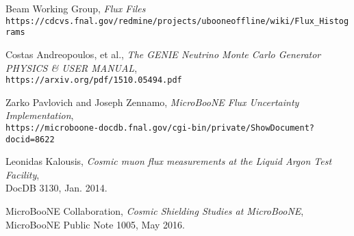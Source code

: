 \begin{thebibliography}{20}
  Beam Working Group, \emph{Flux Files}\\
  \texttt{https://cdcvs.fnal.gov/redmine/projects/ubooneoffline/wiki/Flux\_Histograms}

  Costas Andreopoulos, et al., \emph{The GENIE Neutrino Monte Carlo Generator PHYSICS \& USER MANUAL},\\
  \texttt{https://arxiv.org/pdf/1510.05494.pdf}


  Zarko Pavlovich and Joseph Zennamo, \emph{MicroBooNE Flux Uncertainty Implementation},\\
  \texttt{https://microboone-docdb.fnal.gov/cgi-bin/private/ShowDocument?docid=8622}

Leonidas Kalousis, \emph{Cosmic muon flux measurements at the Liquid Argon Test Facility}, \\DocDB 3130, Jan. 2014. 

MicroBooNE Collaboration, \emph{Cosmic Shielding Studies at MicroBooNE}, \\ MicroBooNE Public Note 1005, May 2016.


\end{thebibliography}

